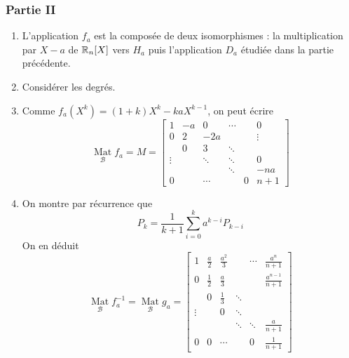 \subsubsection*{Partie II}
\begin{enumerate}
\item L'application $f_a$ est la composée de deux isomorphismes : la multiplication par $X-a$ de $\mathbb{R}_n[X]$ vers $H_a$ puis l'application $D_a$ étudiée dans la partie précédente.
\item Considérer les degrés.
\item Comme $f_a(X^k)=(1+k)X^k-kaX^{k-1}$, on peut écrire
\begin{displaymath}
\underset{\mathcal{B}}{\mathop{\mathrm{Mat}}}f_a=M=
\left[ 
\begin{array}{llllll}
1       & -a & 0      & \cdots &   & 0  \\ 
0       & 2  & -2a    &        &   & \vdots \\ 
        & 0  & 3      & \ddots &   &  \\ 
\vdots  &    & \ddots & \ddots &   & 0 \\ 
        &    &        & \ddots &   & -na \\ 
0       &    & \cdots &        & 0 & n+1
\end{array}
\right] 
\end{displaymath}
\item On montre par récurrence que
\[P_k=\frac{1}{k+1}\sum_{i=0}^ka^{k-i}P_{k-i}\]
On en déduit
\begin{displaymath}
\underset{\mathcal{B}}{\mathop{\mathrm{Mat}}}f_a^{-1}= \underset{\mathcal{B}}{\mathop{\mathrm{Mat}}}g_a= \left[ 
\begin{array}{llllll}
1 & \frac{a}{2} & \frac{a^2}{3} &  & \cdots & \frac{a^n}{n+1} \\ 
0 & \frac{1}{2} & \frac{a}{3} &  &  & \frac{a^{n-1}}{n+1} \\ 
 & 0 & \frac{1}{3} & \ddots &  &  \\ 
\vdots &  & 0 & \ddots &  &  \\ 
 &  &  & \ddots & \ddots & \frac{a}{n+1} \\ 
0 & 0 & \cdots &  & 0 & \frac{1}{n+1}
\end{array}
\right] 
\end{displaymath}

\end{enumerate}
